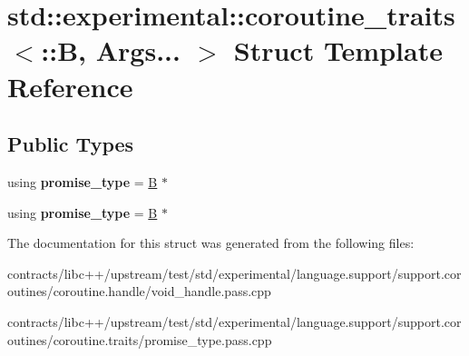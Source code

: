 \hypertarget{structstd_1_1experimental_1_1coroutine__traits_3_1_1_b_00_01_args_8_8_8_01_4}{}\section{std\+:\+:experimental\+:\+:coroutine\+\_\+traits$<$\+:\+:B, Args... $>$ Struct Template Reference}
\label{structstd_1_1experimental_1_1coroutine__traits_3_1_1_b_00_01_args_8_8_8_01_4}
\subsection*{Public Types}
\begin{DoxyCompactItemize}
\item 
\mbox{\label{structstd_1_1experimental_1_1coroutine__traits_3_1_1_b_00_01_args_8_8_8_01_4_a675dfe45d8eb353da43eb50d4c0a3fdc}} 
using {\bfseries promise\+\_\+type} = \mbox{\hyperlink{struct_b}{B}} $\ast$
\item 
\mbox{\label{structstd_1_1experimental_1_1coroutine__traits_3_1_1_b_00_01_args_8_8_8_01_4_a675dfe45d8eb353da43eb50d4c0a3fdc}} 
using {\bfseries promise\+\_\+type} = \mbox{\hyperlink{struct_b}{B}} $\ast$
\end{DoxyCompactItemize}


The documentation for this struct was generated from the following files\+:\begin{DoxyCompactItemize}
\item 
contracts/libc++/upstream/test/std/experimental/language.\+support/support.\+coroutines/coroutine.\+handle/void\+\_\+handle.\+pass.\+cpp\item 
contracts/libc++/upstream/test/std/experimental/language.\+support/support.\+coroutines/coroutine.\+traits/promise\+\_\+type.\+pass.\+cpp\end{DoxyCompactItemize}
